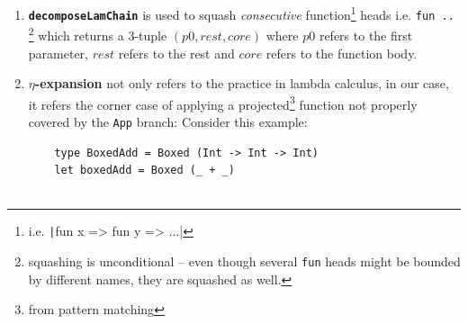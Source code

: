 \documentclass[a4paper, 11pt]{article}
\theoremstyle{remark}\newtheorem*{remark}{Remark}
\theoremstyle{definition}\newtheorem*{definition}{Definition}
\begin{document}
\begin{enumerate}
\item {\bf \texttt{decomposeLamChain}} is used to squash \textit{consecutive}
  function\footnote{i.e. \texttt|fun x => fun y => ...|}
  heads i.e. \texttt{fun ..}
  \footnote{squashing is unconditional -- even though several \texttt{fun} heads might be bounded by
  different names, they are squashed as well.} which returns a 3-tuple $(p0, rest, core)$ where
  $p0$ refers to the first parameter, $rest$ refers to the rest and $core$ refers to the function body.
\item {\bf $\eta$-expansion} not only refers to the practice in lambda calculus, in our case,
  it refers the corner case of applying a projected\footnote{from pattern matching} function not properly covered by the \texttt{App} branch: Consider this example:
  \begin{verbatim}
    type BoxedAdd = Boxed (Int -> Int -> Int)
    let boxedAdd = Boxed (_ + _)


\end{verbatim}
\end{enumerate}
\end{document}
